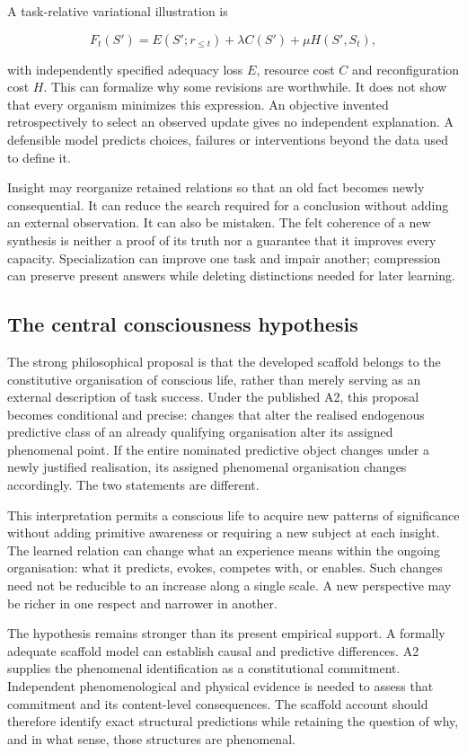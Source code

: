 \documentclass[
  11pt,
  a4paper,
]{article}
\begin{document}
A task-relative variational illustration is

\[F_t(S')=E(S';r_{\le t})+\lambda C(S')+\mu H(S',S_t),\]

with independently specified adequacy loss \(E\), resource cost \(C\)
and reconfiguration cost \(H\). This can formalize why some revisions
are worthwhile. It does not show that every organism minimizes this
expression. An objective invented retrospectively to select an observed
update gives no independent explanation. A defensible model predicts
choices, failures or interventions beyond the data used to define it.

Insight may reorganize retained relations so that an old fact becomes
newly consequential. It can reduce the search required for a conclusion
without adding an external observation. It can also be mistaken. The
felt coherence of a new synthesis is neither a proof of its truth nor a
guarantee that it improves every capacity. Specialization can improve
one task and impair another; compression can preserve present answers
while deleting distinctions needed for later learning.

\subsection{The central consciousness
hypothesis}\label{the-central-consciousness-hypothesis}

The strong philosophical proposal is that the developed scaffold belongs
to the constitutive organisation of conscious life, rather than merely
serving as an external description of task success. Under the published
A2, this proposal becomes conditional and precise: changes that alter
the realised endogenous predictive class of an already qualifying
organisation alter its assigned phenomenal point. If the entire
nominated predictive object changes under a newly justified realisation,
its assigned phenomenal organisation changes accordingly. The two
statements are different.

This interpretation permits a conscious life to acquire new patterns of
significance without adding primitive awareness or requiring a new
subject at each insight. The learned relation can change what an
experience means within the ongoing organisation: what it predicts,
evokes, competes with, or enables. Such changes need not be reducible to
an increase along a single scale. A new perspective may be richer in one
respect and narrower in another.

The hypothesis remains stronger than its present empirical support. A
formally adequate scaffold model can establish causal and predictive
differences. A2 supplies the phenomenal identification as a
constitutional commitment. Independent phenomenological and physical
evidence is needed to assess that commitment and its content-level
consequences. The scaffold account should therefore identify exact
structural predictions while retaining the question of why, and in what
sense, those structures are phenomenal.
\end{document}
